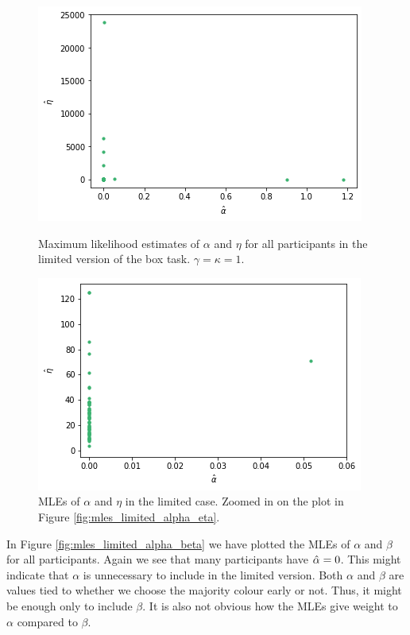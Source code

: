 \begin{figure}
    \centering
    \begin{minipage}{0.48\textwidth}
        \centering
        \includegraphics[scale=0.38]{pictures/plotted_mles_limited_alpha_eta_gk1.png}
        \caption[MLEs of $\alpha$ and $\eta$, limited. $\gamma=\kappa=1$]{Maximum likelihood estimates of $\alpha$ and $\eta$ for all participants in the limited version of the box task. $\gamma=\kappa=1$.}
        \label{fig:mles_limited_alpha_eta}
    \end{minipage}\hfill
    \begin{minipage}{0.48\textwidth}
        \centering
        \includegraphics[scale=0.38]{pictures/plotted_mles_limited_alpha_eta_gk1_zoomed.png}
        \caption[MLEs of $\alpha$ and $\eta$ zoomed, limited. $\gamma=\kappa=1$]{MLEs of $\alpha$ and $\eta$ in the limited case. Zoomed in on the plot in Figure \ref{fig:mles_limited_alpha_eta}.}
        \label{fig:mles_limited_alpha_eta_zoomed}
    \end{minipage}
\end{figure}

In Figure \ref{fig:mles_limited_alpha_beta} we have plotted the MLEs of $\alpha$ and $\beta$ for all participants. Again we see that many participants have $\hat{\alpha}=0$. This might indicate that $\alpha$ is unnecessary to include in the limited version. Both $\alpha$ and $\beta$ are values tied to whether we choose the majority colour early or not. Thus, it might be enough only to include $\beta$. It is also not obvious how the MLEs give weight to $\alpha$ compared to $\beta$.
 
